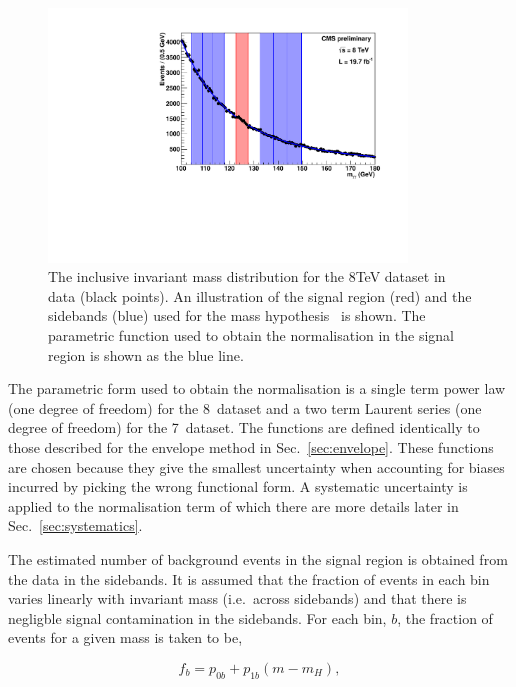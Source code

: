 \begin{figure}
  \begin{center}
    \includegraphics[width=0.85\textwidth]{ch5_anal_and_results/plots/sideband/invmass.pdf}
    \caption{The inclusive invariant mass distribution for the 8TeV dataset in data (black points). An illustration of the signal region (red) and the sidebands (blue) used for the mass hypothesis ~\GeV is shown. The parametric function used to obtain the normalisation in the signal region is shown as the blue line.}
    \label{fig:sideband_norm}
  \end{center}
\end{figure}

The parametric form used to obtain the normalisation is a single term power law (one degree of freedom) for the 8~\TeV dataset and a two term Laurent series (one degree of freedom) for the 7~\TeV dataset. The functions are defined identically to those described for the envelope method in Sec.~\ref{sec:envelope}. These functions are chosen because they give the smallest uncertainty when accounting for biases incurred by picking the wrong functional form. A systematic uncertainty is applied to the normalisation term of which there are more details later in Sec.~\ref{sec:systematics}.

The estimated number of background events in the signal region is obtained from the data in the sidebands. It is assumed that the fraction of events in each bin varies linearly with invariant mass (i.e.~across sidebands) and that there is negligble signal contamination in the sidebands. For each bin, $b$, the fraction of events for a given mass is taken to be,

\begin{equation}
  f_{b} = p_{0b} + p_{1b}(m-m_{H}),
\end{equation}

